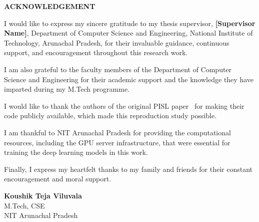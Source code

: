 \begin{center}
\textbf{\Large ACKNOWLEDGEMENT}
\end{center}
\vspace{1cm}

I would like to express my sincere gratitude to my thesis supervisor, \textbf{[Supervisor Name]}, Department of Computer Science and Engineering, National Institute of Technology, Arunachal Pradesh, for their invaluable guidance, continuous support, and encouragement throughout this research work.

I am also grateful to the faculty members of the Department of Computer Science and Engineering for their academic support and the knowledge they have imparted during my M.Tech programme.

I would like to thank the authors of the original PISL paper~\cite{tao2024unsupervised} for making their code publicly available, which made this reproduction study possible.

I am thankful to NIT Arunachal Pradesh for providing the computational resources, including the GPU server infrastructure, that were essential for training the deep learning models in this work.

Finally, I express my heartfelt thanks to my family and friends for their constant encouragement and moral support.

\vspace{2cm}
\begin{flushright}
\textbf{Koushik Teja Viluvala}\\
M.Tech, CSE\\
NIT Arunachal Pradesh
\end{flushright}
